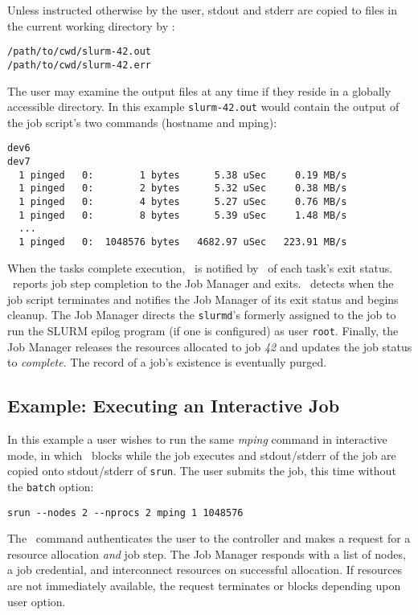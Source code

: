 Unless instructed otherwise by the user, stdout and stderr are
copied to files in the current working directory by \srun :

\begin{verbatim}
/path/to/cwd/slurm-42.out
/path/to/cwd/slurm-42.err
\end{verbatim}

The user may examine the output files at any time if they reside 
in a globally accessible directory. In this example
{\tt slurm-42.out} would  contain the output of the job script's two 
commands (hostname and mping):

\begin{verbatim}
dev6
dev7
  1 pinged   0:        1 bytes      5.38 uSec     0.19 MB/s                     
  1 pinged   0:        2 bytes      5.32 uSec     0.38 MB/s                     
  1 pinged   0:        4 bytes      5.27 uSec     0.76 MB/s                     
  1 pinged   0:        8 bytes      5.39 uSec     1.48 MB/s                     
  ...
  1 pinged   0:  1048576 bytes   4682.97 uSec   223.91 MB/s              
\end{verbatim}

When the tasks complete execution, \srun\ is notified by \slurmd\ of each
task's exit status. \srun\ reports job step completion to the Job Manager
and exits. 
\slurmd\ detects when the job script terminates and notifies
the Job Manager of its exit status and begins cleanup. 
The Job Manager directs the {\tt slurmd}'s formerly assigned to the
job to run the SLURM epilog program (if one is configured) as user 
{\tt root}. 
Finally, the Job Manager releases the resources allocated to job {\em 42}
and updates the job status to {\em complete}. The record of a job's
existence is eventually purged.

\subsection{Example:  Executing an Interactive Job}

In this example a user wishes to run the same {\em mping} command 
in interactive mode, in which \srun\ blocks while the job executes 
and stdout/stderr of the job are copied onto stdout/stderr of {\tt srun}.
The user submits the job, this time without the {\tt batch} option:
\begin{verbatim}
srun --nodes 2 --nprocs 2 mping 1 1048576
\end{verbatim}

The \srun\ command authenticates the user to the controller and
makes a request for a resource allocation {\em and} job step. The Job Manager
responds with a list of nodes, a job credential, and interconnect
resources on successful allocation. If resources are not immediately
available, the request terminates or blocks depending upon user
option.

